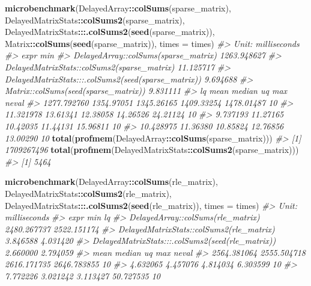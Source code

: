 \documentclass[]{book}
\newenvironment{Shaded}{\begin{snugshade}}{\end{snugshade}}
\newcommand{\KeywordTok}[1]{\textcolor[rgb]{0.13,0.29,0.53}{\textbf{#1}}}
\newcommand{\DataTypeTok}[1]{\textcolor[rgb]{0.13,0.29,0.53}{#1}}
\newcommand{\CommentTok}[1]{\textcolor[rgb]{0.56,0.35,0.01}{\textit{#1}}}
\newcommand{\OperatorTok}[1]{\textcolor[rgb]{0.81,0.36,0.00}{\textbf{#1}}}
\newcommand{\NormalTok}[1]{#1}
\begin{document}
\begin{Shaded}
\begin{Highlighting}[]
\KeywordTok{microbenchmark}\NormalTok{(DelayedArray}\OperatorTok{::}\KeywordTok{colSums}\NormalTok{(sparse_matrix),}
\NormalTok{               DelayedMatrixStats}\OperatorTok{::}\KeywordTok{colSums2}\NormalTok{(sparse_matrix),}
\NormalTok{               DelayedMatrixStats}\OperatorTok{:::}\KeywordTok{.colSums2}\NormalTok{(}\KeywordTok{seed}\NormalTok{(sparse_matrix)),}
\NormalTok{               Matrix}\OperatorTok{::}\KeywordTok{colSums}\NormalTok{(}\KeywordTok{seed}\NormalTok{(sparse_matrix)), }
               \DataTypeTok{times =}\NormalTok{ times)}
\CommentTok{#> Unit: milliseconds}
\CommentTok{#>                                                 expr         min}
\CommentTok{#>                 DelayedArray::colSums(sparse_matrix) 1263.948627}
\CommentTok{#>          DelayedMatrixStats::colSums2(sparse_matrix)   11.125717}
\CommentTok{#>  DelayedMatrixStats:::.colSums2(seed(sparse_matrix))    9.694688}
\CommentTok{#>                 Matrix::colSums(seed(sparse_matrix))    9.831111}
\CommentTok{#>           lq       mean     median         uq        max neval}
\CommentTok{#>  1277.792760 1354.97051 1345.26165 1409.33254 1478.01487    10}
\CommentTok{#>    11.321978   13.61341   12.38058   14.26526   24.21124    10}
\CommentTok{#>     9.737193   11.27165   10.42035   11.44131   15.96811    10}
\CommentTok{#>    10.428975   11.36380   10.85824   12.76856   13.00290    10}
\KeywordTok{total}\NormalTok{(}\KeywordTok{profmem}\NormalTok{(DelayedArray}\OperatorTok{::}\KeywordTok{colSums}\NormalTok{(sparse_matrix)))}
\CommentTok{#> [1] 1709267496}
\KeywordTok{total}\NormalTok{(}\KeywordTok{profmem}\NormalTok{(DelayedMatrixStats}\OperatorTok{::}\KeywordTok{colSums2}\NormalTok{(sparse_matrix)))}
\CommentTok{#> [1] 5464}

\KeywordTok{microbenchmark}\NormalTok{(DelayedArray}\OperatorTok{::}\KeywordTok{colSums}\NormalTok{(rle_matrix),}
\NormalTok{               DelayedMatrixStats}\OperatorTok{::}\KeywordTok{colSums2}\NormalTok{(rle_matrix),}
\NormalTok{               DelayedMatrixStats}\OperatorTok{:::}\KeywordTok{.colSums2}\NormalTok{(}\KeywordTok{seed}\NormalTok{(rle_matrix)), }
               \DataTypeTok{times =}\NormalTok{ times)}
\CommentTok{#> Unit: milliseconds}
\CommentTok{#>                                              expr         min          lq}
\CommentTok{#>                 DelayedArray::colSums(rle_matrix) 2480.267737 2522.151174}
\CommentTok{#>          DelayedMatrixStats::colSums2(rle_matrix)    3.846588    4.031420}
\CommentTok{#>  DelayedMatrixStats:::.colSums2(seed(rle_matrix))    2.660000    2.794059}
\CommentTok{#>         mean      median          uq         max neval}
\CommentTok{#>  2564.381064 2555.504718 2616.171735 2646.783855    10}
\CommentTok{#>     4.632065    4.457076    4.814034    6.303599    10}
\CommentTok{#>     7.772226    3.021242    3.113427   50.727535    10}


\end{Highlighting}
\end{Shaded}
\end{document}
